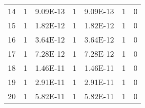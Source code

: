 \documentclass{article}
\begin{document}
\begin{table}[htbp]
\begin{tabular}{lcccccc}
		14        & 1           & 9.09E-13      & 1           & 9.09E-13      & 1           & 0             \\
		15        & 1           & 1.82E-12      & 1           & 1.82E-12      & 1           & 0             \\
		16        & 1           & 3.64E-12      & 1           & 3.64E-12      & 1           & 0             \\
		17        & 1           & 7.28E-12      & 1           & 7.28E-12      & 1           & 0             \\
		18        & 1           & 1.46E-11      & 1           & 1.46E-11      & 1           & 0             \\
		19        & 1           & 2.91E-11      & 1           & 2.91E-11      & 1           & 0             \\
		20        & 1           & 5.82E-11      & 1           & 5.82E-11      & 1           & 0             \\
       \bottomrule
		
	\end{tabular}
\end{table}
\end{document}
